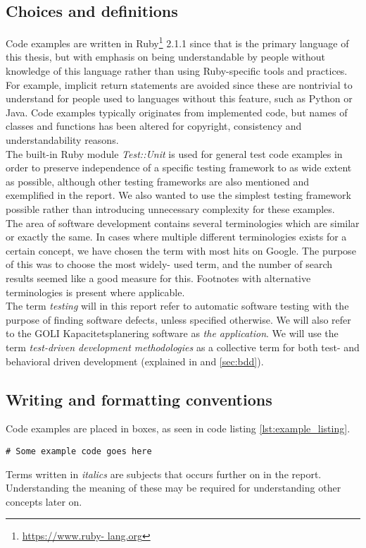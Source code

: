
\subsection{Choices and definitions}

Code examples are written in Ruby\footnote{\url{https://www.ruby-
lang.org}} 2.1.1 since that is the primary language of this thesis, but
with emphasis on being understandable by people without knowledge of
this language rather than using Ruby-specific tools and practices. For
example, implicit return statements are avoided since these are
nontrivial to understand for people used to languages without this
feature, such as Python or Java. Code examples typically originates from
implemented code, but names of classes and functions has been altered
for copyright, consistency and understandability reasons.\\

The built-in Ruby module \emph{Test::Unit} is used for general test code
examples in order to preserve independence of a specific testing
framework to as wide extent as possible, although other testing
frameworks are also mentioned and exemplified in the report. We also
wanted to use the simplest testing framework possible rather than
introducing unnecessary complexity for these examples.\\

The area of software development contains several terminologies which
are similar or exactly the same. In cases where multiple different
terminologies exists for a certain concept, we have chosen the term with
most hits on Google. The purpose of this was to choose the most widely-
used term, and the number of search results seemed like a good measure
for this. Footnotes with alternative terminologies is present where
applicable.\\

The term \emph{testing} will in this report refer to automatic software
testing with the purpose of finding software defects, unless specified
otherwise. We will also refer to the GOLI Kapacitetsplanering software
as \emph{the application}. We will use the term \emph{test-driven
development methodologies} as a collective term for both test- and
behavioral driven development (explained in  and
\ref{sec:bdd}).\\


\subsection{Writing and formatting conventions}

Code examples are placed in boxes, as seen in code listing
\ref{lst:example_listing}.\\

\begin{lstlisting}[caption=An example code listing.,
                   label=lst:example_listing, float=t]
# Some example code goes here
\end{lstlisting}

Terms written in \emph{italics} are subjects that occurs further on in
the report. Understanding the meaning of these may be required for
understanding other concepts later on.\\

